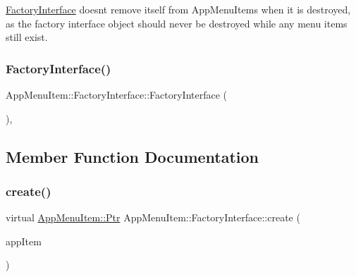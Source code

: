 \mbox{\hyperlink{classAppMenuItem_1_1FactoryInterface}{Factory\+Interface}} doesn\textquotesingle{}t remove itself from App\+Menu\+Items when it is destroyed, as the factory interface object should never be destroyed while any menu items still exist. \mbox{\label{classAppMenuItem_1_1FactoryInterface_ab8109726ea9a5f74b71b7bc84923b287}} 
\subsubsection{\texorpdfstring{Factory\+Interface()}{FactoryInterface()}}
{\footnotesize\ttfamily App\+Menu\+Item\+::\+Factory\+Interface\+::\+Factory\+Interface (\begin{DoxyParamCaption}{ }\end{DoxyParamCaption})\hspace{0.3cm}{\ttfamily [inline]}, {\ttfamily [protected]}}



\subsection{Member Function Documentation}
\mbox{\label{classAppMenuItem_1_1FactoryInterface_a5b176b2573b638c01d71f05655d73ba0}} 
\subsubsection{\texorpdfstring{create()}{create()}\hspace{0.1cm}{\footnotesize\ttfamily [1/3]}}
{\footnotesize\ttfamily virtual \mbox{\hyperlink{classAppMenuItem_ab5f51c5d74f8df62b8862c0cc8126cb7}{App\+Menu\+Item\+::\+Ptr}} App\+Menu\+Item\+::\+Factory\+Interface\+::create (\begin{DoxyParamCaption}\item[{const \mbox{\hyperlink{structAppConfigFile_1_1AppItem}{App\+Config\+File\+::\+App\+Item}} \&}]{app\+Item }\end{DoxyParamCaption})\hspace{0.3cm}{\ttfamily [pure virtual]}}

